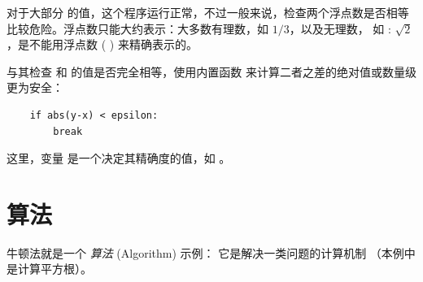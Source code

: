 %

对于大部分  的值，这个程序运行正常，不过一般来说，检查两个浮点数是否相等比较危险。浮点数只能大约表示：大多数有理数，如 $1/3$，以及无理数，
如 : $\sqrt{2}$，是不能用浮点数 (  ) 来精确表示的。
  


与其检查  和  的值是否完全相等，使用内置函数  来计算二者之差的绝对值或数量级更为安全：

\begin{lstlisting}
    if abs(y-x) < epsilon:
        break
\end{lstlisting}

%

这里，变量  是一个决定其精确度的值，如 。

\section{算法}
  


牛顿法就是一个 {\em 算法} (Algorithm) 示例： 它是解决一类问题的计算机制
（本例中是计算平方根）。


